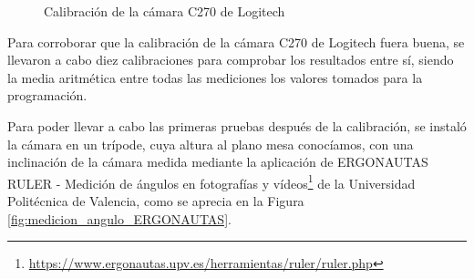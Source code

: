  \begin{figure}[H]
    \begin{center}
      \subcapcentertrue
      \hspace{2mm}
    \end{center}
    \caption{Calibración de la cámara C270 de Logitech}
    \label{fig:calibracion_camara}
  \end{figure}

Para corroborar que la calibración de la cámara C270 de Logitech fuera buena, se llevaron a cabo diez calibraciones para comprobar los resultados entre sí, siendo la media aritmética entre todas las mediciones los valores tomados para la programación.

Para poder llevar a cabo las primeras pruebas después de la calibración, se instaló la cámara en un trípode, cuya altura al plano mesa conocíamos, con una inclinación de la cámara medida mediante la aplicación de ERGONAUTAS RULER - Medición de ángulos en fotografías y vídeos\footnote{\url{https://www.ergonautas.upv.es/herramientas/ruler/ruler.php}} de la Universidad Politécnica de Valencia, como se aprecia en la Figura \ref{fig:medicion_angulo_ERGONAUTAS}.


